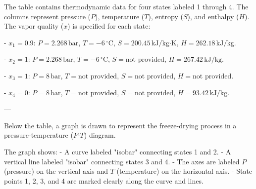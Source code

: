 The table contains thermodynamic data for four states labeled 1 through 4. The columns represent pressure (\(P\)), temperature (\(T\)), entropy (\(S\)), and enthalpy (\(H\)). The vapor quality (\(x\)) is specified for each state:  

- \(x_1 = 0.9\):  
  \(P = 2.268 \, \text{bar}\), \(T = -6 \, ^\circ\text{C}\), \(S = 200.45 \, \text{kJ/kg·K}\), \(H = 262.18 \, \text{kJ/kg}\).  

- \(x_2 = 1\):  
  \(P = 2.268 \, \text{bar}\), \(T = -6 \, ^\circ\text{C}\), \(S = \text{not provided}\), \(H = 267.42 \, \text{kJ/kg}\).  

- \(x_3 = 1\):  
  \(P = 8 \, \text{bar}\), \(T = \text{not provided}\), \(S = \text{not provided}\), \(H = \text{not provided}\).  

- \(x_4 = 0\):  
  \(P = 8 \, \text{bar}\), \(T = \text{not provided}\), \(S = \text{not provided}\), \(H = 93.42 \, \text{kJ/kg}\).  

---

Below the table, a graph is drawn to represent the freeze-drying process in a pressure-temperature (\(P\)-\(T\)) diagram.  

The graph shows:  
- A curve labeled "isobar" connecting states 1 and 2.  
- A vertical line labeled "isobar" connecting states 3 and 4.  
- The axes are labeled \(P\) (pressure) on the vertical axis and \(T\) (temperature) on the horizontal axis.  
- State points 1, 2, 3, and 4 are marked clearly along the curve and lines.